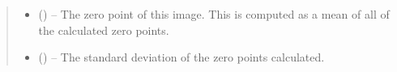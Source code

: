 \documentclass[letterpaper,11pt,english]{sphinxmanual}
\begin{document}
\begin{savenotes}
\begin{fulllineitems}
\begin{savenotes}
\begin{fulllineitems}
\begin{quote}
\begin{description}
\begin{itemize}
\end{itemize}

\sphinxAtStartPar
\begin{itemize}
\item {} 
\sphinxAtStartPar
{} () – The zero point of this image. This is computed as a mean of all of
the calculated zero points.

\item {} 
\sphinxAtStartPar
{} () – The standard deviation of the zero points calculated.

\end{itemize}


\end{description}\end{quote}

\end{fulllineitems}\end{savenotes}


\end{fulllineitems}\end{savenotes}

\end{document}
